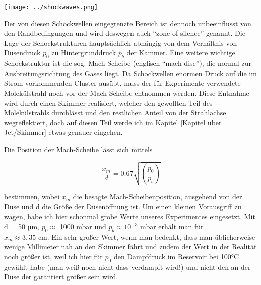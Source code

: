 \begin{center}
\begin{minipage}{\linewidth}
\centering
\texttt{[image: ../shockwaves.png]}%
 \label{fig:Machexpansion}
\end{minipage} 
\end{center} 
 
Der von diesen Schockwellen eingegrenzte Bereich ist dennoch unbeeinflusst von den Randbedingungen und wird deswegen auch \enquote{zone of silence} genannt. 
Die Lage der Schockstrukturen hauptsächlich abhängig von dem Verhältnis von Düsendruck $p_0$ zu Hintergrunddruck $p_b$ der Kammer. Eine weitere wichtige Schockstruktur ist die sog. Mach-Scheibe (englisch \enquote{mach disc}), die normal zur Ausbreitungsrichtung des Gases liegt. Da Schockwellen enormen Druck auf die im Strom vorkommenden Cluster ausübt, muss der für Experimente verwendete Molekülstrahl noch vor der Mach-Scheibe entnommen werden. Diese Entnahme wird durch einen Skimmer realisiert, welcher den gewollten Teil des Molekülstrahls durchlässt und den restlichen Anteil von der Strahlachse wegreflektiert, doch auf diesen Teil werde ich im Kapitel [Kapitel über Jet/Skimmer] etwas genauer eingehen. 

Die Position der Mach-Scheibe lässt sich mittels

\begin{equation}
\frac{x_m}{d}=0.67 \sqrt{\left( \frac{p_0}{p_b}\right)}
\end{equation}

bestimmen, wobei $x_m$ die besagte Mach-Scheibenposition, ausgehend von der Düse und d die Größe der Düsenöffnung ist.
Um einen kleinen Vorausgriff zu wagen, habe ich hier schonmal grobe Werte unseres Experimentes eingesetzt. Mit d = 50 µm, $p_0 \approx$ 1000 mbar und $p_b \approx 10^{-3}$  mbar erhält man für\\ $x_m \approx 3,35$ cm. Ein sehr großer Wert, wenn man bedenkt, dass man üblicherweise wenige Millimeter nah an den Skimmer fährt und zudem der Wert in der Realität noch größer ist, weil ich hier für $p_0$ den Dampfdruck im Reservoir bei 100°C gewählt habe (man weiß noch nicht dass verdampft wird!) und nicht den an der Düse der garantiert größer sein wird.



